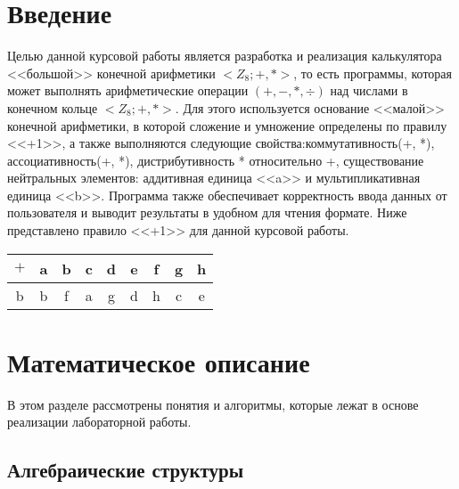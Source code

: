 \documentclass[10pt,a4paper,final]{article} %
\begin{document}
	\tableofcontents
	
	\newpage
	\section* {Введение}

	Целью данной курсовой работы является разработка и реализация калькулятора <<большой>> конечной арифметики $<Z_8;+,*>$, то есть программы, которая может выполнять арифметические операции $(+,-,*,\div)$ над числами в конечном кольце $<Z_8;+,*>$. Для этого используется основание <<малой>> конечной арифметики, в которой сложение и умножение определены по правилу <<+1>>, а также выполняются следующие свойства:коммутативность(+, *), ассоциативность(+, *), дистрибутивность * относительно +, существование нейтральных элементов: аддитивная единица <<a>> и мультипликативная единица <<b>>. Программа также обеспечивает корректность ввода данных от пользователя и выводит результаты в удобном для чтения формате. Ниже представлено правило <<+1>> для данной курсовой работы.
	
	\begin{table}[h]
		\hspace{5em} %
		\centering
		\begin{minipage}{.5\textwidth}
			\centering
			\begin{tabular}{c|c c c c c c c c}
				$+$ & a & b & c & d & e & f & g & h \\
				\hline
				b & b & f & a & g & d & h & c & e \\
			\end{tabular}
			
		\end{minipage}
	\end{table}
	

	
		\newpage
	\section {Математическое описание}
	В этом разделе рассмотрены понятия и алгоритмы, которые лежат в основе реализации лабораторной работы.
	
	\subsection{Алгебраические структуры}
\end{document}
